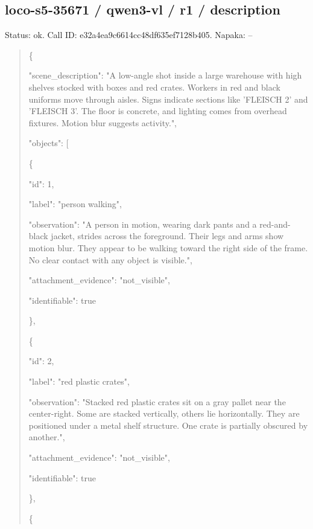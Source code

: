 \documentclass[10pt,a4paper]{article}
\begin{document}
\subsection*{loco-s5-35671 / qwen3-vl / r1 / description}
Status: ok. Call ID: e32a4ea9c6614cc48df635ef7128b405. Napaka: --
\begin{quote}\footnotesize
\{\par
  "scene\_description":\allowbreak{} "A low-angle shot inside a large warehouse with high shelves stocked with boxes and red crates. Workers in red and black uniforms move through aisles. Signs indicate sections like 'FLEISCH 2' and 'FLEISCH 3'. The floor is concrete,\allowbreak{} and lighting comes from overhead fixtures. Motion blur suggests activity.",\allowbreak{}\par
  "objects":\allowbreak{} [\par
    \{\par
      "id":\allowbreak{} 1,\allowbreak{}\par
      "label":\allowbreak{} "person walking",\allowbreak{}\par
      "observation":\allowbreak{} "A person in motion,\allowbreak{} wearing dark pants and a red-and-black jacket,\allowbreak{} strides across the foreground. Their legs and arms show motion blur. They appear to be walking toward the right side of the frame. No clear contact with any object is visible.",\allowbreak{}\par
      "attachment\_evidence":\allowbreak{} "not\_visible",\allowbreak{}\par
      "identifiable":\allowbreak{} true\par
    \},\allowbreak{}\par
    \{\par
      "id":\allowbreak{} 2,\allowbreak{}\par
      "label":\allowbreak{} "red plastic crates",\allowbreak{}\par
      "observation":\allowbreak{} "Stacked red plastic crates sit on a gray pallet near the center-right. Some are stacked vertically,\allowbreak{} others lie horizontally. They are positioned under a metal shelf structure. One crate is partially obscured by another.",\allowbreak{}\par
      "attachment\_evidence":\allowbreak{} "not\_visible",\allowbreak{}\par
      "identifiable":\allowbreak{} true\par
    \},\allowbreak{}\par
    \{\par

\end{quote}
\end{document}

